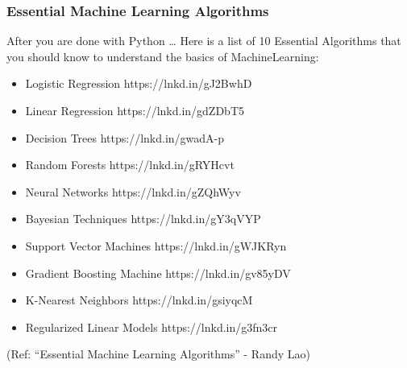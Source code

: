 \begin{frame}\frametitle{Essential Machine Learning Algorithms}
After you are done with Python \ldots
Here is a list of 10 Essential Algorithms that you should know to understand the basics of MachineLearning: 
\footnotesize
\begin{itemize}
\item Logistic Regression
https://lnkd.in/gJ2BwhD

\item Linear Regression
https://lnkd.in/gdZDbT5

\item  Decision Trees
https://lnkd.in/gwadA-p

\item Random Forests
https://lnkd.in/gRYHcvt

\item  Neural Networks
https://lnkd.in/gZQhWyv

\item  Bayesian Techniques
https://lnkd.in/gY3qVYP

\item  Support Vector Machines
https://lnkd.in/gWJKRyn

\item  Gradient Boosting Machine
https://lnkd.in/gv85yDV

\item  K-Nearest Neighbors
https://lnkd.in/gsiyqcM

\item  Regularized Linear Models
https://lnkd.in/g3fn3cr
\end{itemize}

(Ref: ``Essential Machine Learning Algorithms'' - Randy Lao)
\end{frame}

